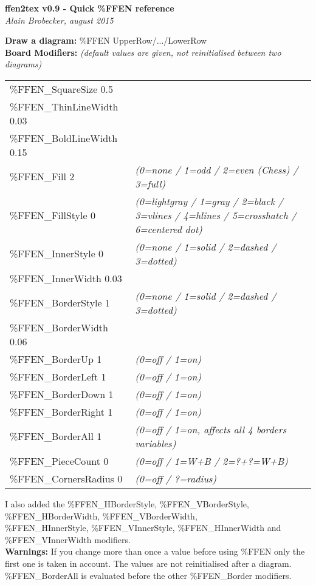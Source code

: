 \documentclass[10pt,a4paper]{article}
\begin{document}
\newpage
\begin{center}
{\bf ffen2tex v0.9 - Quick  \%{FFEN} reference}\\
{\sl Alain Brobecker, august 2015}
\end{center}


\noindent
{\bf Draw a diagram:} \%{FFEN UpperRow/.../LowerRow}\\

\noindent
{\bf Board Modifiers:} {\sl (default values are given, not reinitialised between two diagrams)}\\
\begin{tabular}{ll}
\%FFEN\_SquareSize 0.5 & \\
\%FFEN\_ThinLineWidth 0.03 & \\
\%FFEN\_BoldLineWidth 0.15 & \\
\%FFEN\_Fill 2  & {\sl (0=none / 1=odd / 2=even (Chess) / 3=full)} \\
\%FFEN\_FillStyle 0  & {\sl (0=lightgray / 1=gray / 2=black / 3=vlines / 4=hlines / 5=crosshatch / 6=centered dot)} \\
\%FFEN\_InnerStyle 0  & {\sl (0=none / 1=solid / 2=dashed / 3=dotted)} \\
\%FFEN\_InnerWidth 0.03 & \\
\%FFEN\_BorderStyle 1 & {\sl (0=none / 1=solid / 2=dashed / 3=dotted)} \\
\%FFEN\_BorderWidth 0.06 & \\
\%FFEN\_BorderUp 1 &{\sl (0=off / 1=on)} \\
\%FFEN\_BorderLeft 1 & {\sl (0=off / 1=on)} \\
\%FFEN\_BorderDown 1 & {\sl (0=off / 1=on)} \\
\%FFEN\_BorderRight 1 & {\sl (0=off / 1=on)} \\
\%FFEN\_BorderAll 1 & {\sl (0=off / 1=on, affects all 4 borders variables)} \\
\%FFEN\_PieceCount 0 &  {\sl (0=off / 1=W+B / 2=?+?=W+B)} \\
\%FFEN\_CornersRadius 0 &  {\sl (0=off / ?=radius)} \\
\end{tabular}
I also added the \%FFEN\_HBorderStyle, \%FFEN\_VBorderStyle, \%FFEN\_HBorderWidth, \%FFEN\_VBorderWidth,\\
\%FFEN\_HInnerStyle, \%FFEN\_VInnerStyle, \%FFEN\_HInnerWidth and \%FFEN\_VInnerWidth modifiers.\\
{\bf Warnings:} If you change more than once a value before using \%{FFEN} only the first one
is taken in account. The values are not reinitialised after a diagram.
\%FFEN\_BorderAll is evaluated before the other \%FFEN\_Border modifiers.\\
\end{document}
